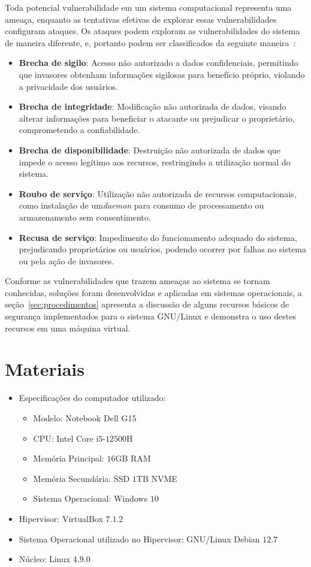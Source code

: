 \documentclass[
  12pt,				%
  oneside,   	        %
  a4paper,			%
  english,			%
  french,				%
  spanish,			%
  brazil,				%
  ]{pacotes/abntex2}
\begin{document}
Toda potencial vulnerabilidade em um sistema computacional representa uma ameaça, enquanto as tentativas efetivas de explorar essas vulnerabilidades configuram ataques. Os ataques podem exploram as vulnerabilidades do sistema de maneira diferente, e, portanto podem ser classificados da seguinte maneira~\cite{silberschatz2015}:

\begin{itemize}
    \item \textbf{Brecha de sigilo}: Acesso não autorizado a dados confidenciais, permitindo que invasores obtenham informações sigilosas para benefício próprio, violando a privacidade dos usuários.
    \item \textbf{Brecha de integridade}:  Modificação não autorizada de dados, visando alterar informações para beneficiar o atacante ou prejudicar o proprietário, comprometendo a confiabilidade.
    \item \textbf{Brecha de disponibilidade}: Destruição não autorizada de dados que impede o acesso legítimo aos recursos, restringindo a utilização normal do sistema.
    \item \textbf{Roubo de serviço}: Utilização não autorizada de recursos computacionais, como instalação de um\textit{daemon} para consumo de processamento ou armazenamento sem consentimento.
    \item \textbf{Recusa de serviço}: Impedimento do funcionamento adequado do sistema, prejudicando proprietários ou usuários, podendo ocorrer por falhas no sistema ou pela ação de invasores.
\end{itemize}

Conforme as vulnerabilidades que trazem ameaças ao sistema se tornam conhecidas, soluções foram desenvolvidas e aplicadas em sistemas operacionais, a seção~\ref{sec:procedimentos} apresenta a discussão de alguns recursos básicos de segurança implementados para o sistema GNU/Linux e demonstra o uso destes recursos em uma máquina virtual.

\section{Materiais}
\label{sec:materiais}

\begin{itemize}
  \item Especificações do computador utilizado:
  \begin{itemize}
    \item Modelo: Notebook Dell G15
    \item CPU: Intel Core i$5$-$12500$H
    \item Memória Principal: $16$GB RAM
    \item Memória Secundária: SSD $1$TB NVME
    \item Sistema Operacional: Windows $10$
  \end{itemize}
  \item Hipervisor: VirtualBox $7.1.2$
  \item Sistema Operacional utilizado no Hipervisor: GNU/Linux Debian $12.7$
  \item Núcleo: Linux $4.9.0$ 
\end{itemize}
\end{document}
